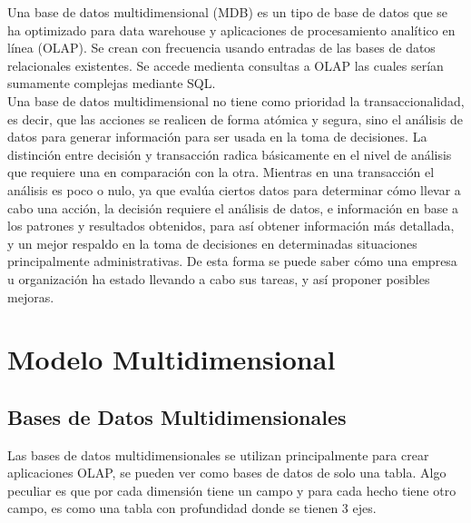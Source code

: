 \documentclass[DIV=calc, paper=a4, fontsize=11pt, twocolumn]{scrartcl}	 %
\begin{document}
Una base de datos multidimensional (MDB) es un tipo de base de datos que se ha optimizado para data warehouse y 
aplicaciones de procesamiento anal\'{i}tico en l\'{i}nea (OLAP). Se crean con frecuencia usando entradas de las 
bases de datos relacionales existentes. Se accede medienta consultas a OLAP las cuales ser\'{i}an sumamente complejas mediante SQL.\\
Una base de datos multidimensional no tiene como prioridad la transaccionalidad, es decir, que las acciones se realicen de 
forma at\'{o}mica y segura, sino el an\'{a}lisis de datos para generar informaci\'{o}n para ser usada en  la toma de decisiones.
La distinci\'{o}n entre decisi\'{o}n y transacci\'{o}n radica b\'{a}sicamente en el nivel de an\'{a}lisis que requiere una 
en comparaci\'{o}n con la otra.
Mientras en una transacci\'{o}n el an\'{a}lisis es poco o nulo, ya que eval\'{u}a ciertos datos para determinar c\'{o}mo 
llevar a cabo una acci\'{o}n, la decisi\'{o}n requiere el an\'{a}lisis de datos, e informaci\'{o}n en base a los patrones 
y resultados obtenidos, para as\'{i} obtener informaci\'{o}n m\'{a}s detallada, y un mejor respaldo en la toma de 
decisiones en determinadas situaciones principalmente administrativas. De esta forma se puede saber c\'{o}mo una empresa 
u organizaci\'{o}n ha estado llevando a cabo  sus tareas, y as\'{i} proponer posibles mejoras.



\section*{Modelo Multidimensional }
\subsection*{Bases de Datos Multidimensionales}

Las bases de datos multidimensionales se utilizan principalmente para crear aplicaciones OLAP, se pueden ver como bases de datos de solo una tabla. Algo peculiar es que por cada dimensi\'{o}n tiene un campo y para cada hecho tiene otro campo, es como una tabla con profundidad donde se tienen 3 ejes.\\

\end{document}
